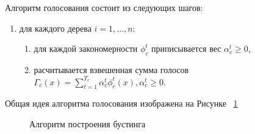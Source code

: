 Алгоритм голосования состоит из следующих шагов:
\begin{enumerate}
	\item для каждого дерева $i = 1, ..., n$:
	\begin{enumerate}
		\item для каждой закономерности $\phi^{t}_{c}$ приписывается вес $\alpha_{c}^{t} \geq 0$,
		\item расчитывается взвешенная сумма голосов $ \Gamma_c(x) = \displaystyle\sum_{t=1}^{T_c} \alpha_c^t\phi_c^t(x), \alpha_c^t \geq 0$.
	\end{enumerate}
\end{enumerate}

 Общая идея алгоритма голосования изображена на Рисунке ~\cref{fig:votesum}
\begin{figure}[ht]
    \caption{Алгоритм построения бустинга }\label{fig:votesum}
\end{figure}


